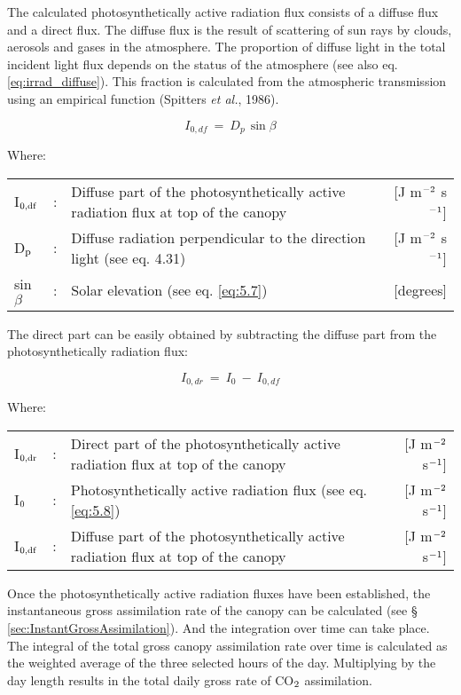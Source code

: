 The calculated photosynthetically active radiation flux consists of a diffuse flux and a
direct flux. The diffuse flux is the result of scattering of sun rays by clouds, aerosols and
gases in the atmosphere. The proportion of diffuse light in the total incident light flux
depends on the status of the atmosphere (see also eq. \ref{eq:irrad_diffuse}). This fraction 
is calculated from the atmospheric transmission using an empirical function (Spitters 
{\it et al.}, 1986).

\begin{equation}
I_{0,df} ~=~ D _{p~} \sin \beta
\end{equation}

Where:\\[5pt]
\begin{tabularx}{\textwidth}{llXr}
	I$_{{\rm 0,df}}$ &:& Diffuse part of the photosynthetically active radiation flux 
	at top of the canopy    &    [J m$^{{\rm -2}}$ s$^{{\rm -1}}$]\\
	D$_{{\rm p}}$ &:& Diffuse radiation perpendicular to the direction 
	light (see eq. 4.31)    &    [J m$^{{\rm -2}}$ s$^{{\rm -1}}$]\\
	sin$\beta$ &:& Solar elevation (see eq. \ref{eq:5.7})    &    [degrees]\\
\end{tabularx}

The direct part can be easily obtained by subtracting the diffuse part from the
photosynthetically radiation flux:

\begin{equation}
I_{0,dr} ~=~ I_{0} ~-~I_{0,df} 
\end{equation}

Where:\\[5pt]
\begin{tabularx}{\textwidth}{llXr}
	I$_{{\rm 0,dr}}$ &:& Direct part of the photosynthetically active radiation flux 
	at top of the canopy    &    [J m$^{{\rm -2}}$ s$^{{\rm -1}}$]\\
	I$_{{\rm 0}}$ &:& Photosynthetically active radiation flux (see eq. \ref{eq:5.8})    &  
	[J m$^{{\rm -2}}$ s$^{{\rm -1}}$]\\
	I$_{{\rm 0,df}}$ &:& Diffuse part of the photosynthetically active radiation flux 
	at top of the canopy     &   [J m$^{{\rm -2}}$ s$^{{\rm -1}}$]\\
\end{tabularx}

Once the photosynthetically active radiation fluxes have been established, the 
instantaneous gross assimilation rate of the canopy can be calculated (see \S
\ref{sec:InstantGrossAssimilation}). And the integration over time can take place.
The integral of the total gross canopy assimilation rate over time is calculated as the
weighted average of the three selected hours of the day. Multiplying by the day length
results in the total daily gross rate of CO$_{{\rm 2}}$ assimilation. 

